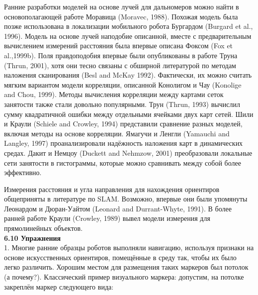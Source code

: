 \documentclass[10pt,a4paper]{article}
\begin{document}
Ранние разработки моделей на основе лучей для дальномеров можно найти в основополагающей работе Моравица (Moravec, 1988). Похожая модель была позже использована в локализации мобильного робота Бургардом (Burgard et al., 1996). Модель на основе лучей наподобие описанной, вместе с предварительным вычислением измерений расстояния была впервые описана Фоксом (Fox et al.,1999b). Поля правдоподобия впервые были опубликованы в работе Труна (Thrun, 2001), хотя они тесно связаны с обширной литературой по методам наложения сканирования (Besl and McKay 1992). Фактически, их можно считать мягким вариантом модели корреляции, описанной Конолигом и Чау (Konolige and Chou, 1999). Методы вычисления корреляции между картами сеток занятости также стали довольно популярными. Трун (Thrun, 1993) вычислил сумму квадратичной ошибки между отдельными ячейками двух карт сетей. Шили и Краули (Schiele and Crowley, 1994) представили сравнение разных моделей, включая методы на основе корреляции. Ямагучи и Ленгли (Yamauchi and Langley, 1997) проанализировали надёжность наложения карт в динамических средах. Дакит и Немцоу (Duckett and Nehmzow, 2001) преобразовали локальные сети занятости в гистограммы, которые можно сравнивать между собой более эффективно. 

Измерения расстояния и угла направления для нахождения ориентиров общеприняты в литературе по SLAM. Возможно, впервые они были упомянуты Леонардом и Дюран-Уайтом (Leonard and Durrant-Whyte, 1991). В более ранней работе Краули (Crowley, 1989) вывел модели измерения для прямолинейных объектов.\\

\textbf{6.10 Упражнения}\\

1. Многие ранние образцы роботов выполняли навигацию, используя признаки на основе искусственных ориентиров, помещённые в среду так, чтобы их было легко различить. Хорошим местом для размещения таких маркеров был потолок (а почему?). Классический пример визуального маркера: допустим, на потолке закреплён  маркер следующего вида:

\begin{figure}[H]
	\label{fig:614orig}
\end{figure}
\end{document}
